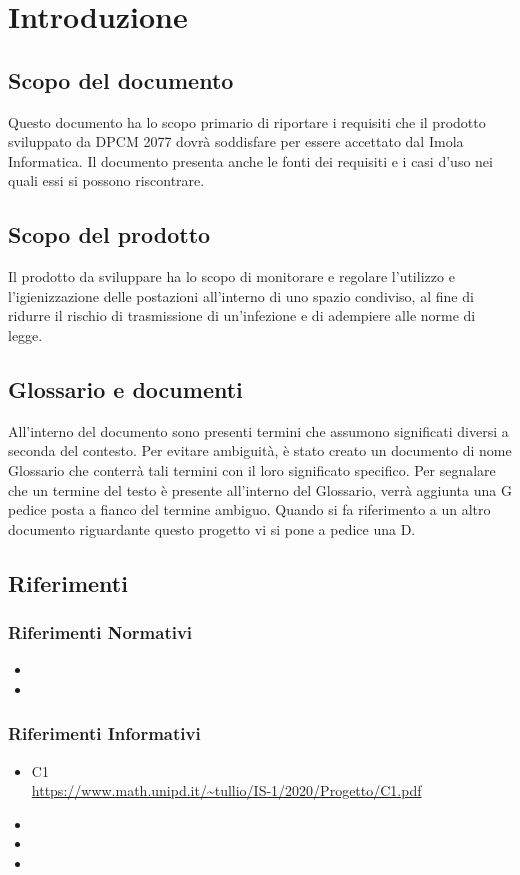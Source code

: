 \section{Introduzione}

\subsection{Scopo del documento}
Questo documento ha lo scopo primario di riportare i requisiti che il prodotto sviluppato da DPCM 2077 dovrà soddisfare per essere accettato dal  Imola Informatica.
Il documento presenta anche le fonti dei requisiti e i casi d'uso nei quali essi si possono riscontrare.
\subsection{Scopo del prodotto}
Il prodotto da sviluppare ha lo scopo di monitorare e regolare l'utilizzo e l'igienizzazione delle postazioni all'interno di uno spazio condiviso, al fine di ridurre il rischio di trasmissione di un'infezione e di adempiere alle norme di legge. 
\subsection{Glossario e documenti} 
All'interno del  documento sono presenti termini che assumono significati diversi a seconda del contesto.
Per evitare ambiguità, è stato creato un  documento di nome Glossario che  conterrà tali termini con il loro significato specifico. Per segnalare che un termine del testo è presente all'interno del Glossario, verrà aggiunta una G pedice posta a fianco del termine ambiguo.
Quando si fa riferimento a un altro documento riguardante questo progetto vi si pone a pedice una D.
\subsection{Riferimenti}
\subsubsection{Riferimenti Normativi}
\begin{itemize}
	\item {}
	\item {}
\end{itemize}

\subsubsection{Riferimenti Informativi}
\begin{itemize}
	\item{C1 \\
		\url{https://www.math.unipd.it/~tullio/IS-1/2020/Progetto/C1.pdf}}
	\item {}
	\item {}
	\item {}
\end{itemize}